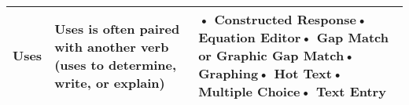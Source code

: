 \documentclass[11pt, English]{article}
\begin{document}
\begin{longtable}{|p{1.8cm}|p{6.0cm}|p{8.7cm}|}
 \hline
	  Uses & Uses is often paired with another verb (uses to determine, write, or explain) & • Constructed Response\newline• Equation Editor\newline• Gap Match or Graphic Gap Match\newline• Graphing\newline• Hot Text\newline• Multiple Choice\newline• Text Entry\\
 \hline
	 	  \hline



\end{longtable}
\end{document}
